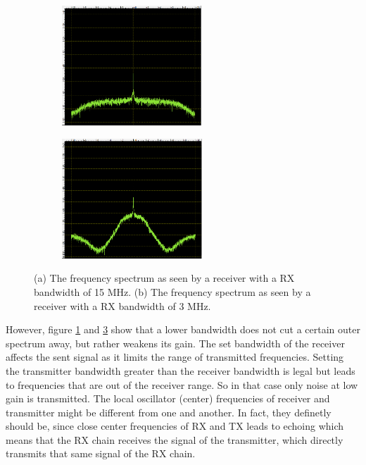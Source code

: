 \documentclass[journal]{IEEEtran}
\begin{document}
\begin{figure}
\centering
\begin{subfigure}[b]{0.45\textwidth}
   \includegraphics[width=1\linewidth, height=4.5cm]{fig/bandwidth_15MHz.PNG}
   \caption{}
   \label{fig:bw1} 
\end{subfigure}

\begin{subfigure}[b]{0.45\textwidth}
   \includegraphics[width=1\linewidth, height=4.5cm]{fig/bandwidth_3MHz.PNG}
   \caption{}
   \label{fig:bw2}
\end{subfigure}

\caption{ (a) The  frequency spectrum as seen by a receiver with a RX bandwidth of 15 MHz. 
 (b) The  frequency spectrum as seen by a receiver with a RX bandwidth of 3 MHz.  }
\end{figure}


However, figure \ref{fig:bw1} and \ref{fig:bw2} show that a lower bandwidth does not cut a certain outer spectrum away, but rather weakens its gain. 
The set bandwidth of the receiver affects the sent signal as it limits the range of transmitted frequencies. 
Setting the transmitter bandwidth greater than the receiver bandwidth is legal but leads to frequencies that are out of the receiver range.
So in that case only noise at low gain is transmitted.
The local oscillator (center) frequencies of receiver and transmitter might be different from one and another.
In fact, they definetly should be, since close center frequencies of RX and TX leads to echoing which means that the RX chain receives the signal of the transmitter, which directly transmits that same signal of the RX chain. 
\end{document}
